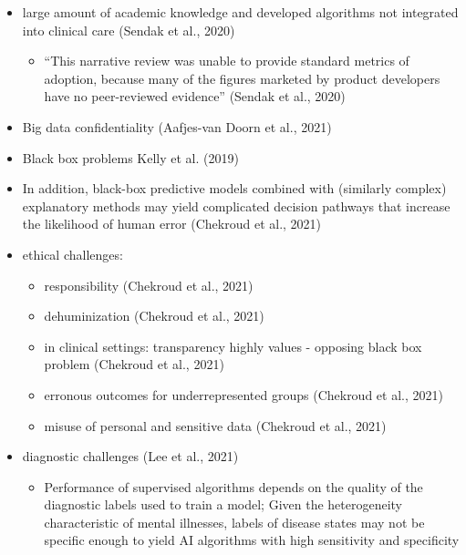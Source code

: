 \documentclass[
  man]{apa7}
\providecommand{\tightlist}{%
  \setlength{\itemsep}{0pt}\setlength{\parskip}{0pt}}
\begin{document}
\begin{itemize}
\tightlist
\item
  large amount of academic knowledge and developed algorithms not integrated into clinical care (Sendak et al., 2020)

  \begin{itemize}
  \tightlist
  \item
    ``This narrative review was unable to provide standard metrics of adoption, because many of the figures marketed by product developers have no peer-reviewed evidence'' (Sendak et al., 2020)
  \end{itemize}
\item
  Big data confidentiality (Aafjes-van Doorn et al., 2021)
\item
  Black box problems Kelly et al. (2019)
\item
  In addition, black-box predictive models combined with (similarly complex) explanatory methods may yield complicated decision pathways that increase the likelihood of human error (Chekroud et al., 2021)
\item
  ethical challenges:

  \begin{itemize}
  \tightlist
  \item
    responsibility (Chekroud et al., 2021)
  \item
    dehuminization (Chekroud et al., 2021)
  \item
    in clinical settings: transparency highly values - opposing black box problem (Chekroud et al., 2021)
  \item
    erronous outcomes for underrepresented groups (Chekroud et al., 2021)
  \item
    misuse of personal and sensitive data (Chekroud et al., 2021)
  \end{itemize}
\item
  diagnostic challenges (Lee et al., 2021)

  \begin{itemize}
  \tightlist
  \item
    Performance of supervised algorithms depends on the quality of the diagnostic labels used to train a model; Given the heterogeneity characteristic of mental illnesses, labels of disease states may not be specific enough to yield AI algorithms with high sensitivity and specificity


\end{itemize}
\end{itemize}
\end{document}
